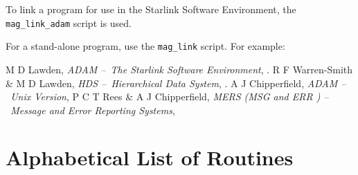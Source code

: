 \documentclass[11pt]{starlink}
\providecommand{\dash}{--}
\begin{document}
To link a program for use in the Starlink Software Environment,
the \texttt{mag\_\-link\_\-adam} script is used.

\begin{small}
\begin{terminalv}
\end{terminalv}
\end{small}

For a stand-alone program, use the \texttt{mag\_\-link} script.
For example:
\begin{small}
\begin{terminalv}
\end{terminalv}
\end{small}

\begin{thebibliography}{9}
 M D Lawden, \textit{ADAM \dash\ The Starlink Software Environment},
.
 R F Warren-Smith \& M D Lawden, \textit{HDS \dash\ Hierarchical Data
System}, .
 A J Chipperfield, \textit{ADAM \dash\ Unix Version},
 P C T Rees \& A J Chipperfield, \textit{MERS (MSG and ERR )
\dash\ Message and Error Reporting Systems},
\end{thebibliography}

\appendix


\section{Alphabetical List of Routines}
\end{document}
